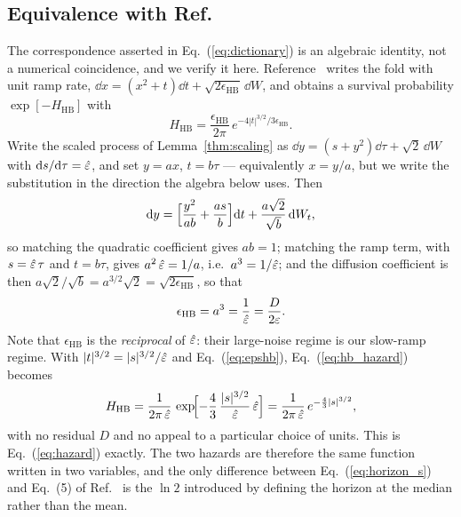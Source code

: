 \subsection{\label{app:identity}Equivalence with Ref.~\cite{HerbertBouchet2017}}

The correspondence asserted in Eq.~(\ref{eq:dictionary}) is an algebraic identity, not a numerical coincidence, and we verify it here.  Reference~\cite{HerbertBouchet2017} writes the fold with unit ramp rate, $\dd x=(x^2+t)\dd t+\sqrt{2\epsilon_{\mathrm{HB}}}\,\dd W$, and obtains a survival probability $\exp[-H_{\mathrm{HB}}]$ with
\begin{equation}
\label{eq:hb_hazard}
H_{\mathrm{HB}}=\frac{\epsilon_{\mathrm{HB}}}{2\pi}\,e^{-4|t|^{3/2}/3\epsilon_{\mathrm{HB}}} .
\end{equation}
Write the scaled process of Lemma~\ref{thm:scaling} as $\dd y=(s+y^2)\dd\tau+\sqrt2\,\dd W$ with $\mathrm{d} s/\mathrm{d}\tau=\hat\varepsilon$, and set $y=ax$, $t=b\tau$ --- equivalently $x=y/a$, but we write the substitution in the direction the algebra below uses.  Then
\begin{equation}
\mathrm{d} y=\Bigl[\frac{y^2}{ab}+\frac{as}{b}\Bigr]\mathrm{d} t+\frac{a\sqrt2}{\sqrt b}\,\mathrm{d} W_t ,
\end{equation}
so matching the quadratic coefficient gives $ab=1$; matching the ramp term, with $s=\hat\varepsilon\,\tau$ and $t=b\tau$, gives $a^2\,\hat\varepsilon=1/a$, i.e.\ $a^3=1/\hat\varepsilon$; and the diffusion coefficient is then $a\sqrt{2}/\sqrt b=a^{3/2}\sqrt2=\sqrt{2\epsilon_{\mathrm{HB}}}$, so that
\begin{equation}
\label{eq:epshb}
\epsilon_{\mathrm{HB}}=a^3=\frac{1}{\hat\varepsilon}=\frac{D}{2\varepsilon}.
\end{equation}
Note that $\epsilon_{\mathrm{HB}}$ is the \emph{reciprocal} of $\hat\varepsilon$: their large-noise regime is our slow-ramp regime.  With $|t|^{3/2}=|s|^{3/2}/\hat\varepsilon$ and Eq.~(\ref{eq:epshb}), Eq.~(\ref{eq:hb_hazard}) becomes
\begin{equation}
H_{\mathrm{HB}}
=\frac{1}{2\pi\,\hat\varepsilon}\,\exp\!\Bigl[-\frac{4}{3}\,\frac{|s|^{3/2}}{\hat\varepsilon}\,\hat\varepsilon\Bigr]
=\frac{1}{2\pi\,\hat\varepsilon}\,e^{-\frac43|s|^{3/2}},
\end{equation}
with no residual $D$ and no appeal to a particular choice of units.  This is Eq.~(\ref{eq:hazard}) exactly.  The two hazards are therefore the same function written in two variables, and the only difference between Eq.~(\ref{eq:horizon_s}) and Eq.~(5) of Ref.~\cite{HerbertBouchet2017} is the $\ln2$ introduced by defining the horizon at the median rather than the mean.

